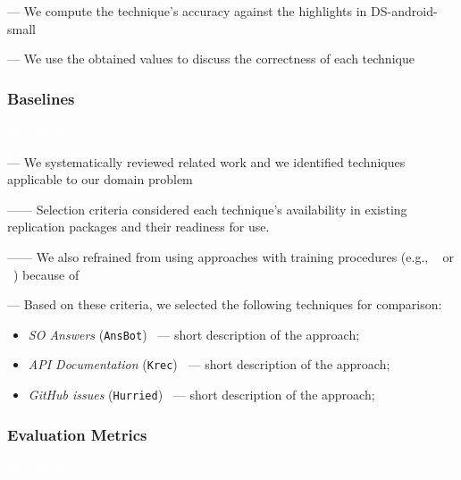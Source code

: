 --- We compute the technique's accuracy against the highlights in \acs{DS-android-small}

--- We use the obtained values to discuss the correctness of each technique



\subsubsection{Baselines}
\label{cp4:comparison-techniques}
\textcolor{white}{force ident} %

--- We systematically reviewed related work and we identified techniques applicable to our domain problem

------ Selection criteria considered each technique's availability in existing replication packages and their readiness for use.

------ We also refrained from using approaches with training procedures (e.g., ~\cite{liu2020} or ~\cite{Treude2016}) because of ~\cite{Chaparro2017, fucci2019} \vspace{3mm}


--- Based on these criteria, we selected the following techniques for comparison:


\begin{itemize}[leftmargin=\parindent, font=\normalfont\itshape]
    \item \textit{SO Answers} (\texttt{\acs{AnsBot}})~\cite{Xu2017} --- short description of the approach;
    
    \item \textit{API Documentation} (\texttt{\acs{Krec}})~\cite{Robillard2015} --- short description of the approach;
    
    \item \textit{GitHub issues} (\texttt{\acs{Hurried}})~\cite{Lotufo2012} --- short description of the approach;

\end{itemize}






\subsubsection{Evaluation Metrics}
\textcolor{white}{force ident} %

